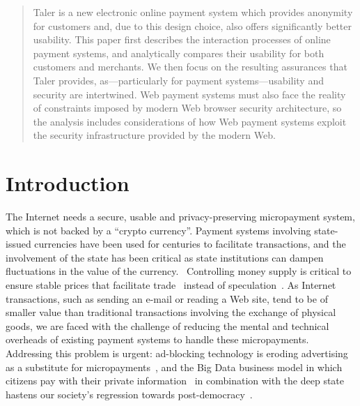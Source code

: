 \documentclass{IEEEtran}
\begin{document}
\author{
 \\
}
\maketitle

\begin{abstract}
Taler is a new electronic online payment system which provides
anonymity for customers and, due to this design choice, also offers
significantly better usability.  This paper first describes the interaction
processes of online payment systems, and analytically compares their
usability for both customers and merchants.  We then focus on the
resulting assurances that Taler provides, as---particularly for payment
systems---usability and security are intertwined.  Web payment systems
must also face the reality of constraints imposed by modern Web
browser security architecture, so the analysis includes considerations of
how Web payment systems exploit the security infrastructure provided
by the modern Web.
\end{abstract}

\section{Introduction}

The Internet needs a secure, usable and privacy-preserving
micropayment system, which is not backed by a ``crypto currency''.
Payment systems involving state-issued currencies have been used for
centuries to facilitate transactions, and the involvement of the state
has been critical as state institutions can dampen fluctuations in the
value of the currency.~\cite{dominguez1993} Controlling money supply
is critical to ensure stable prices that facilitate
trade~\cite{quantitytheory1997volckart} instead of speculation~\cite{lewis_btc_is_junk}.
As  Internet transactions, such as sending an e-mail or reading
a Web site, tend to be of smaller value than traditional transactions
involving the exchange of physical goods, we are faced with the
challenge of reducing the mental and technical overheads of existing
payment systems to handle these micropayments.  Addressing this problem is
urgent: ad-blocking technology is eroding advertising as a substitute
for micropayments~\cite{adblockblocks}, and the Big Data business
model in which citizens pay with their private
information~\cite{ehrenberg2014data} in combination with the deep
state hastens our society's regression towards
post-democracy~\cite{rms2013democracy}.
\end{document}

